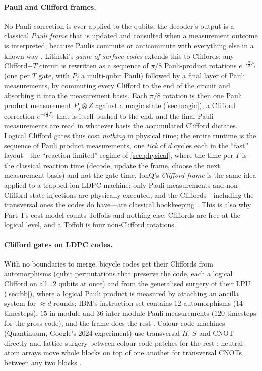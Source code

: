 \paragraph{Pauli and Clifford frames.}\label{sec:frames} No Pauli correction is ever applied to the qubits: the decoder's output is a classical \emph{Pauli frame} that is updated and consulted when a measurement outcome is interpreted, because Paulis commute or anticommute with everything else in a known way \cite{knill05}. Litinski's \emph{game of surface codes} \cite{litinski19game} extends this to Cliffords: any Clifford$+T$ circuit is rewritten as a sequence of $\pi/8$ Pauli-product rotations $e^{-i\frac\pi8P_j}$ (one per $T$ gate, with $P_j$ a multi-qubit Pauli) followed by a final layer of Pauli measurements, by commuting every Clifford to the end of the circuit and absorbing it into the measurement basis. Each $\pi/8$ rotation is then one Pauli product measurement $P_j\otimes\bar Z$ against a magic state (\cref{sec:magic}), a Clifford correction $e^{\pm i\frac\pi4P_j}$ that is itself pushed to the end, and the final Pauli measurements are read in whatever basis the accumulated Clifford dictates. Logical Clifford gates thus cost \emph{nothing} in physical time; the entire runtime is the sequence of Pauli product measurements, one \emph{tick} of $d$ cycles each in the ``fast'' layout---the ``reaction-limited'' regime of \cref{sec:physical}, where the time per $T$ is the classical reaction time (decode, update the frame, choose the next measurement basis) and not the gate time. IonQ's \emph{Clifford frame} is the same idea applied to a trapped-ion LDPC machine: only Pauli measurements and non-Clifford state injections are physically executed, and the Cliffords---including the transversal ones the codes do have---are classical bookkeeping \cite{walkingcat26,haener26}. This is also why Part~I's cost model counts Toffolis and nothing else: Cliffords are free at the logical level, and a Toffoli is four non-Clifford rotations.

\paragraph{Clifford gates on LDPC codes.} With no boundaries to merge, bicycle codes get their Cliffords from automorphisms (qubit permutations that preserve the code, each a logical Clifford on all $12$ qubits at once) and from the generalised surgery of their LPU (\cref{sec:bb}), where a logical Pauli product is measured by attaching an ancilla system for $\approx d$ rounds; IBM's instruction set contains $12$ automorphisms ($14$ timesteps), $15$ in-module and $36$ inter-module Pauli measurements ($120$ timesteps for the gross code), and the frame does the rest \cite{yoder25tour,cross24surgery}. Colour-code machines (Quantinuum, Google's 2024 experiment) use transversal $H$, $S$ and CNOT directly and lattice surgery between colour-code patches for the rest \cite{ryan-anderson24,lacroix24color}; neutral-atom arrays move whole blocks on top of one another for transversal CNOTs between any two blocks \cite{bluvstein24}.

